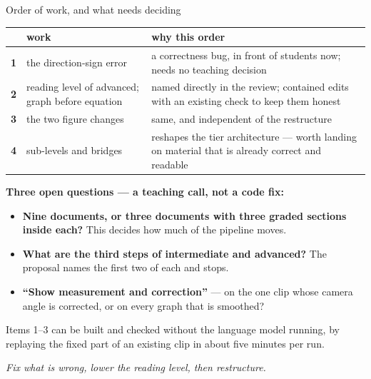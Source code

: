 \documentclass[aspectratio=169,10pt]{beamer}
\newcommand{\takeaway}[1]{\vfill{\footnotesize\itshape\color{cGrey}#1\par}}
\begin{document}
\begin{frame}{Order of work, and what needs deciding}
\scriptsize
\renewcommand{\arraystretch}{1.45}
\begin{tabular}{@{}clp{7.4cm}@{}}
\toprule
& \textbf{work} & \textbf{why this order} \\
\midrule
\textbf{1} & the direction-sign error &
a correctness bug, in front of students now; needs no teaching decision \\
\textbf{2} & reading level of advanced; graph before equation &
named directly in the review; contained edits with an existing check to keep them honest \\
\textbf{3} & the two figure changes &
same, and independent of the restructure \\
\textbf{4} & sub-levels and bridges &
reshapes the tier architecture --- worth landing on material that is already correct and readable \\
\bottomrule
\end{tabular}
\vspace{7pt}

\textbf{\color{cAccent}Three open questions --- a teaching call, not a code fix:}
\begin{itemize}\setlength\itemsep{2pt}
  \item \textbf{Nine documents, or three documents with three graded sections inside each?}
        This decides how much of the pipeline moves.
  \item \textbf{What are the third steps of intermediate and advanced?} The proposal names the
        first two of each and stops.
  \item \textbf{``Show measurement and correction''} --- on the one clip whose camera angle is
        corrected, or on every graph that is smoothed?
\end{itemize}
\vspace{2pt}

Items 1--3 can be built and checked without the language model running, by replaying the
fixed part of an existing clip in about five minutes per run.
\takeaway{Fix what is wrong, lower the reading level, then restructure.}
\end{frame}
\end{document}
